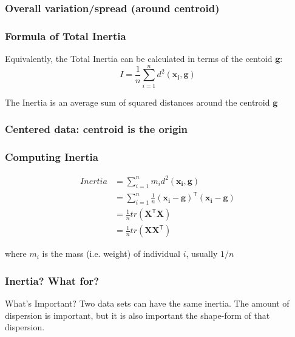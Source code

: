 \documentclass[12pt]{beamer}\usepackage[]{graphicx}\usepackage[]{color}
\begin{document}
\begin{frame}
\frametitle{Overall variation/spread (around centroid)}
\begin{center}
\end{center}
\end{frame}


\begin{frame}
\frametitle{Formula of Total Inertia}

Equivalently, the Total Inertia can be calculated in terms of the centoid $\mathbf{g}$:
$$
I = \frac{1}{n} \sum_{i = 1}^{n}{d^2(\mathbf{x_i}, \mathbf{g})}
$$

The Inertia is an average sum of squared distances around the centroid $\mathbf{g}$

\end{frame}


\begin{frame}
\frametitle{Centered data: centroid is the origin}
\begin{center}
\end{center}
\end{frame}


\begin{frame}
\frametitle{Computing Inertia}

\begin{align*}
Inertia &= \sum_{i=1}^{n} m_i d^2(\mathbf{x_i}, \mathbf{g}) \\
& = \sum_{i=1}^{n} \frac{1}{n} (\mathbf{x_i} - \mathbf{g})^{\mathsf{T}}(\mathbf{x_i} - \mathbf{g}) \\
& = \frac{1}{n} tr(\mathbf{X^\mathsf{T} X}) \\
& = \frac{1}{n} tr(\mathbf{X X^\mathsf{T}})
\end{align*}

where $m_i$ is the mass (i.e. weight) of individual $i$, usually $1/n$

\end{frame}


\begin{frame}
\frametitle{Inertia? What for?}

\begin{block}{What's Important?}
Two data sets can have the same inertia. The amount of dispersion is important, but it is also important the shape-form of that dispersion.
\end{block}

\end{frame}
\end{document}
